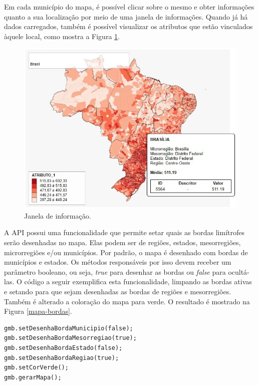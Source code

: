 \documentclass[12pt]{article}
\begin{document}
Em cada município do mapa, é possível clicar sobre o mesmo e obter informações quanto a sua localização por meio de uma janela de informações. Quando já há dados carregados, também é possível visualizar os atributos que estão vinculados àquele local, como mostra a Figura \ref{mapaInfo}.

\begin{figure}[!h]
\centering
\includegraphics[scale=0.6]{mapa-info.jpg}
\caption{Janela de informação.}
\label{mapaInfo}
\end{figure}

A API possui uma funcionalidade que permite setar quais as bordas limítrofes serão desenhadas no mapa. Elas podem ser de regiões, estados, mesorregiões, microrregiões e/ou municípios. Por padrão, o mapa é desenhado com bordas de municípios e estados. Os métodos responsáveis por isso devem receber um parâmetro booleano, ou seja, \textit{true} para desenhar as bordas ou \textit{false} para ocultá-las. O código a seguir exemplifica esta funcionalidade, limpando as bordas ativas e setando para que sejam desenhadas as bordas de regiões e mesorregiões. Também é alterado a coloração do mapa  para verde. O resultado é mostrado na Figura \ref{mapa-bordas}.

\begin{lstlisting}
gmb.setDesenhaBordaMunicipio(false);
gmb.setDesenhaBordaMesorregiao(true);
gmb.setDesenhaBordaEstado(false);
gmb.setDesenhaBordaRegiao(true);
gmb.setCorVerde();
gmb.gerarMapa();
\end{lstlisting}
\end{document}
